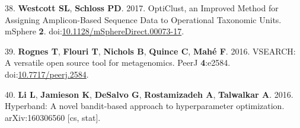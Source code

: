 \documentclass[11pt,]{article}
\begin{document}
\hypertarget{ref-westcott_opticlust_2017}{}
38. \textbf{Westcott SL}, \textbf{Schloss PD}. 2017. OptiClust, an
Improved Method for Assigning Amplicon-Based Sequence Data to
Operational Taxonomic Units. mSphere \textbf{2}.
doi:\href{https://doi.org/10.1128/mSphereDirect.00073-17}{10.1128/mSphereDirect.00073-17}.

\hypertarget{ref-rognes_vsearch_2016}{}
39. \textbf{Rognes T}, \textbf{Flouri T}, \textbf{Nichols B},
\textbf{Quince C}, \textbf{Mahé F}. 2016. VSEARCH: A versatile open
source tool for metagenomics. PeerJ \textbf{4}:e2584.
doi:\href{https://doi.org/10.7717/peerj.2584}{10.7717/peerj.2584}.

\hypertarget{ref-li_hyperband:_2016}{}
40. \textbf{Li L}, \textbf{Jamieson K}, \textbf{DeSalvo G},
\textbf{Rostamizadeh A}, \textbf{Talwalkar A}. 2016. Hyperband: A novel
bandit-based approach to hyperparameter optimization. arXiv:160306560
{[}cs, stat{]}.
\end{document}
